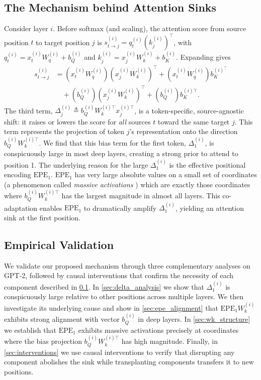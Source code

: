 \documentclass[11pt]{article}
\newif\ifBacklogcomments
\newcommand{\Backlog}[1]{\ifBacklogcomments\textcolor{blue}{[Backlog: #1]}\fi}
\begin{document}
\subsection{The Mechanism behind Attention Sinks}\label{sec:mechanism}
Consider layer $i$. Before softmax (and scaling), the attention score from source position $t$ to target position $j$ is $s_{t\to j}^{(i)} = q_t^{(i)} (k_j^{(i)})^\top$, with $q_t^{(i)} =  x_t^{(i)}W_q^{(i)} + b_Q^{(i)}$ and $k_j^{(i)} = x_j^{(i)}W_k^{(i)}  + b_K^{(i)}$. Expanding gives
\[
\begin{aligned}
s_{t\to j}^{(i)} &= (x_t^{(i)}W_q^{(i)})(x_j^{(i)}W_k^{(i)})^\top  + (x_t^{(i)}W_q^{(i)}) b_K^{(i)^\top} \\
&\quad + (b_Q^{(i)})(x_j^{(i)}W_k^{(i)})^\top  + (b_Q^{(i)}) b_K^{(i)\top}.
\end{aligned}
\]
The third term, $\Delta_j^{(i)} \triangleq b_Q^{(i)}W_k^{(i)\top} x_j^{(i)\top}$, is a token-specific, source-agnostic shift: it raises or lowers the score for \emph{all} sources $t$ toward the same target $j$. This term represents the projection of token $j$'s representation onto the direction $b_Q^{(i)}W_k^{(i)\top}$. We find that this bias term for the first token, $\Delta_1^{(i)}$, is conspicuously large in most deep layers, creating a strong prior to attend to position 1. The underlying reason for the large $\Delta_1^{(i)}$ is the effective positional encoding $\mathrm{EPE}_1$. $\mathrm{EPE}_1$ has very large absolute values on a small set of coordinates (a phenomenon called \textit{massive activations} \cite{sun2024massive}) which are exactly those coordinates where $b_Q^{(i)}W_k^{(i)\top}$ has the largest magnitude in almost all layers. This co-adaptation enables $\mathrm{EPE}_1$ to dramatically amplify $\Delta_1^{(i)}$, yielding an attention sink at the first position. \Backlog{Can we add a diagram to illustrate this? This sounds time consuming but really really helpful since this passage turned out to be somewhat dense. Let's wait to see how much space we have before doing this}

\subsection{Empirical Validation}
We validate our proposed mechanism through three complementary analyses on GPT-2, followed by causal interventions that confirm the necessity of each component described in \cref{sec:mechanism}. In \cref{sec:delta_analysis} we show that $\Delta_1^{(i)}$ is conspicuously large relative to other positions across multiple layers. We then investigate its underlying cause and show in \cref{sec:epe_alignment} that $\mathrm{EPE}_1W_k^{(i)}$ exhibits strong alignment with vector $b_Q^{(i)}$ in deep layers. In \cref{sec:wk_structure} we establish that $\mathrm{EPE}_1$ exhibits massive activations precisely at coordinates where the bias projection $b_Q^{(i)} W_k^{(i)\top}$ has high magnitude. Finally, in \cref{sec:interventions} we use causal interventions to verify that disrupting any component abolishes the sink while transplanting components transfers it to new positions.
\end{document}

